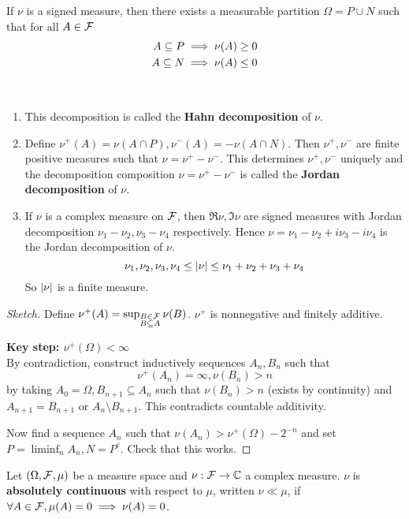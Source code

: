 \documentclass{article}
\begin{document}
\begin{nthm}\label{thm:hahn-decomp}
  If $\nu$ is a signed measure, then there exists a measurable partition $\Omega = P \cup N$ such that for all $A \in \mathcal F$
  \begin{align*}
    A \subseteq P & \implies \nu(A) \ge 0 \\
    A \subseteq N & \implies \nu(A) \le 0
  \end{align*}
\end{nthm}
\begin{rmks}~
  
  \begin{enumerate}
    \item This decomposition is called the {\bf Hahn decomposition} of $\nu$.
    \item Define $\nu^+(A) = \nu(A \cap P), \nu^-(A) = -\nu(A \cap N)$. Then $\nu^+, \nu^-$ are finite positive measures such that $\nu = \nu^+ - \nu^-$. This determines $\nu^+, \nu^-$ uniquely and the decomposition composition $\nu = \nu^+ - \nu^-$ is called the {\bf Jordan decomposition} of $\nu$.
    \item If $\nu$ is a complex measure on $\mathcal F$, then $\Re\nu, \Im\nu$ are signed measures with Jordan decomposition $\nu_1 - \nu_2, \nu_3 - \nu_4$ respectively. Hence $\nu = \nu_1 - \nu_2 + i\nu_3 - i\nu_4$ is the Jordan decomposition of $\nu$.
    $$\nu_1, \nu_2, \nu_3, \nu_4 \le \left\lvert \nu\right\rvert \le \nu_1 + \nu_2 + \nu_3 + \nu_4$$
    So $\left\lvert \nu\right\rvert$ is a finite measure.
  \end{enumerate}
\end{rmks}
\begin{proof}[Sketch]
  Define $\nu^+(A) = \sup_{\substack{B \in \mathcal F \\ B \subseteq A}} \nu(B)$. $\nu^+$ is nonnegative and finitely additive.

  {\bf Key step: $\nu^+(\Omega) < \infty$} \\
  By contradiction, construct inductively sequences $A_n, B_n$ such that
  $$\nu^+(A_n) = \infty, \nu(B_n) > n$$
  by taking $A_0 = \Omega, B_{n + 1} \subseteq A_n$ such that $\nu(B_n) > n$ (exists by continuity) and $A_{n + 1} = B_{n + 1}$ or $A_n \setminus B_{n + 1}$. This contradicts countable additivity.

  Now find a sequence $A_n$ such that $\nu(A_n) > \nu^+(\Omega) - 2^{-n}$ and set $P = \liminf_n A_n, N = P^c$. Check that this works.
\end{proof}

\newlec

\begin{defi}
  Let $(\Omega, \mathcal F, \mu)$ be a measure space and $\nu : \mathcal F \rightarrow \mathbb C$ a complex measure. $\nu$ is {\bf absolutely continuous} with respect to $\mu$, written $\nu \ll \mu$, if $\forall A \in \mathcal F, \mu(A) = 0 \implies \nu(A) = 0$.
\end{defi}
\end{document}
